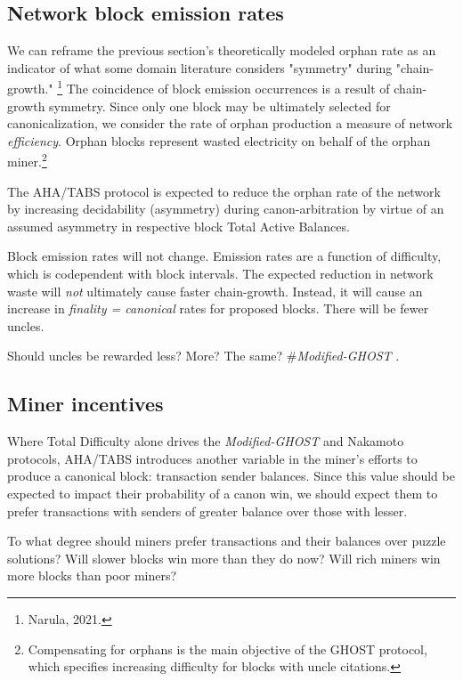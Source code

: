 \documentclass[11pt]{article}
\theoremstyle{plain}
\newcommand{\mghost}{\textit{Modified-GHOST }}
\begin{document}
\subsection{\normalsize{Network block emission rates}}

We can reframe the previous section's theoretically modeled orphan rate
as an indicator of what some domain literature considers "symmetry" during "chain-growth."\nolinebreak
\footnote{Narula, 2021.}
The coincidence of block emission occurrences is a result of chain-growth symmetry.
Since only one block may be ultimately selected for canonicalization, we consider the rate of orphan production
a measure of network \emph{efficiency}.
Orphan blocks represent wasted electricity on behalf of the orphan miner.\footnote{
    Compensating for orphans is the main objective of the GHOST protocol,
    which specifies increasing difficulty for blocks with uncle citations.
}

The AHA/TABS protocol is expected to reduce the orphan rate of the network by increasing decidability (asymmetry)
during canon-arbitration by virtue of an assumed asymmetry in respective block Total Active Balances.

Block emission rates will not change.
Emission rates are a function of difficulty, which is codependent with block intervals.
The expected reduction in network waste will \emph{not} ultimately cause faster chain-growth.
Instead, it will cause an increase in \emph{finality = canonical} rates for proposed blocks.
There will be fewer uncles.

Should uncles be rewarded less? More? The same? \#\mghost.

\subsection{\normalsize{Miner incentives}}

Where Total Difficulty alone drives the \mghost and Nakamoto protocols,
AHA/TABS introduces another variable in the miner's efforts to produce a canonical block: transaction sender balances.
Since this value should be expected to impact their probability of a canon win, we should expect them
to prefer transactions with senders of greater balance over those with lesser.

To what degree should miners prefer transactions and their balances over puzzle solutions?
Will slower blocks win more than they do now?
Will rich miners win more blocks than poor miners?
\end{document}
